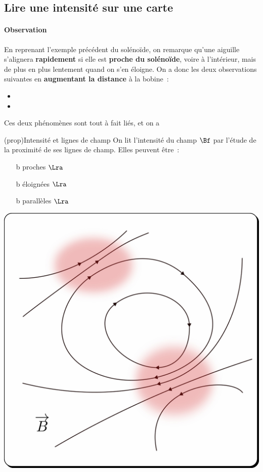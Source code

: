 \documentclass[../../main/main.tex]{subfiles}
\begin{document}
\subsection{Lire une intensité sur une carte}
\paragraph*{Observation}
En reprenant l'exemple précédent du solénoïde, on remarque qu'une aiguille
s'alignera \textbf{rapidement} si elle est \textbf{proche du solénoïde}, voire à
l'intérieur, mais de plus en plus lentement quand on s'en éloigne. On a donc les
deux observations suivantes en \textbf{augmentant la distance} à la bobine~:
\begin{itemize}
	\item {}
	\item {}
\end{itemize}
Ces deux phénomènes sont tout à fait liés, et on a
\begin{tcb*}[sidebyside, righthand ratio=.25](prop){Intensité et lignes de champ}
		On lit l'intensité du champ $\Bf$ par l'étude de la proximité de ses lignes
    de champ. Elles peuvent être~:
			\begin{itemize}
        \item[b]{proches} $\Lra$ 
				\item[b]{éloignées} $\Lra$ 
				\item[b]{parallèles} $\Lra$ 
			\end{itemize}
      \tcblower
      \begin{center}
        \includegraphics[width=\linewidth]{ldc_intens}
      \end{center}
\end{tcb*}
\end{document}
